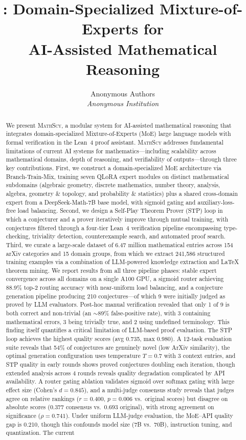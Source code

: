 \documentclass[11pt,a4paper]{article}
\title{\mathscy{}: Domain-Specialized Mixture-of-Experts for\\AI-Assisted Mathematical Reasoning}
\author{
Anonymous Authors\\[4pt]
\textit{Anonymous Institution}
}
\date{}
\newcommand{\mathscy}{\textsc{MathScy}}
\begin{document}
\maketitle

\begin{abstract}
We present \mathscy{}, a modular system for AI-assisted mathematical reasoning that integrates domain-specialized Mixture-of-Experts (MoE) large language models with formal verification in the Lean~4 proof assistant. \mathscy{} addresses fundamental limitations of current AI systems for mathematics---including scalability across mathematical domains, depth of reasoning, and verifiability of outputs---through three key contributions. First, we construct a domain-specialized MoE architecture via Branch-Train-Mix, training seven QLoRA expert modules on distinct mathematical subdomains (algebraic geometry, discrete mathematics, number theory, analysis, algebra, geometry \& topology, and probability \& statistics) plus a shared cross-domain expert from a DeepSeek-Math-7B base model, with sigmoid gating and auxiliary-loss-free load balancing. Second, we design a Self-Play Theorem Prover (STP) loop in which a conjecturer and a prover iteratively improve through mutual training, with conjectures filtered through a four-tier Lean~4 verification pipeline encompassing type-checking, triviality detection, counterexample search, and automated proof search. Third, we curate a large-scale dataset of 6.47 million mathematical entries across 154 arXiv categories and 15 domain groups, from which we extract 241,586 structured training examples via a combination of LLM-powered knowledge extraction and LaTeX theorem mining. We report results from all three pipeline phases: stable expert convergence across all domains on a single A100 GPU, a sigmoid router achieving 88.9\% top-2 routing accuracy with near-uniform load balancing, and a conjecture generation pipeline producing 210 conjectures---of which 9 were initially judged as proved by LLM evaluators. Post-hoc manual verification revealed that only 1 of 9 is both correct and non-trivial (an $\sim$89\% false-positive rate), with 3 containing mathematical errors, 3 being trivially true, and 2 using undefined terminology. This finding itself quantifies a critical limitation of LLM-based proof evaluation. The STP loop achieves the highest quality scores (avg 0.735, max 0.980). A 12-task evaluation suite reveals that 54\% of conjectures are genuinely novel (low ArXiv similarity), the optimal generation configuration uses temperature $T{=}0.7$ with 3 context entries, and STP quality in early rounds shows proved conjectures doubling each iteration, though extended analysis across 4 rounds reveals quality degradation complicated by API availability. A router gating ablation validates sigmoid over softmax gating with large effect size (Cohen's $d = 0.845$), and a multi-judge consensus study reveals that judges agree on relative rankings ($r = 0.400$, $p = 0.006$ vs.\ original scores) but disagree on absolute scores ($0.377$ consensus vs.\ $0.693$ original), with strong agreement on significance ($\rho = 0.741$). Under uniform LLM-judge evaluation, the MoE--API quality gap is 0.210, though this confounds model size (7B vs.\ 70B), instruction tuning, and quantization. The current 
\end{abstract}
\end{document}
